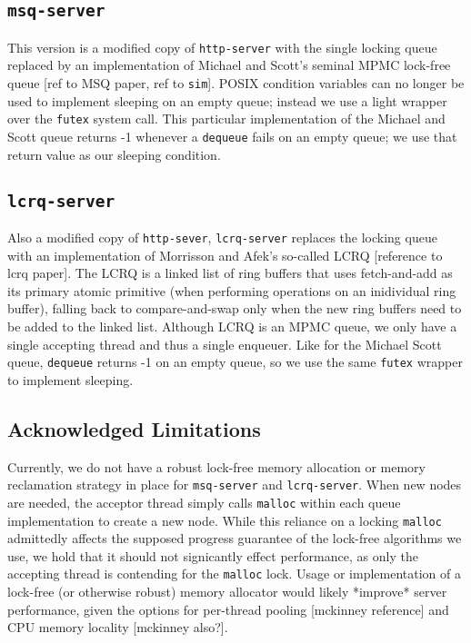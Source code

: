 \documentclass[twoside]{article}
\begin{document}
\begin{multicols}{2}
\subsection{\verb+msq-server+}

This version is a modified copy of \verb+http-server+ with the single
locking queue replaced by an implementation of Michael and Scott's
seminal MPMC lock-free queue [ref to MSQ paper, ref to \verb+sim+]. POSIX
condition variables can no longer be used to implement sleeping on an
empty queue; instead we use a light wrapper over the \verb+futex+ system
call. This particular implementation of the Michael and Scott queue
returns -1 whenever a \verb+dequeue+ fails on an empty queue; we use that
return value as our sleeping condition.

\subsection{\verb+lcrq-server+}

Also a modified copy of \verb+http-sever+, \verb+lcrq-server+ replaces the
locking queue with an implementation of Morrisson and Afek's so-called
LCRQ [reference to lcrq paper]. The LCRQ is a linked list of ring
buffers that uses fetch-and-add as its primary atomic primitive (when
performing operations on an inidividual ring buffer), falling back to
compare-and-swap only when the new ring buffers need to be added to
the linked list. Although LCRQ is an MPMC queue, we only have a single
accepting thread and thus a single enqueuer. Like for the Michael
Scott queue, \verb+dequeue+ returns -1 on an empty queue, so we use the
same \verb+futex+ wrapper to implement sleeping.

\subsection{Acknowledged Limitations}

Currently, we do not have a robust lock-free memory allocation or
memory reclamation strategy in place for \verb+msq-server+ and
\verb+lcrq-server+. When new nodes are needed, the acceptor thread simply
calls \verb+malloc+ within each queue implementation to create a new
node. While this reliance on a locking \verb+malloc+ admittedly affects the
supposed progress guarantee of the lock-free algorithms we use, we
hold that it should not signicantly effect performance, as only the
accepting thread is contending for the \verb+malloc+ lock. Usage or
implementation of a lock-free (or otherwise robust) memory allocator
would likely *improve* server performance, given the options for
per-thread pooling [mckinney reference] and CPU memory locality
[mckinney also?].


\end{multicols}
\end{document}
